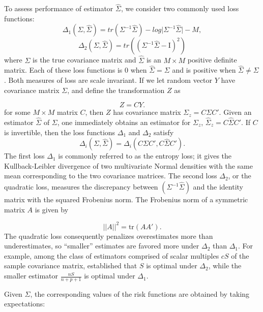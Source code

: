 \documentclass[12pt]{article}
\theoremstyle{definition}
\begin{document}
To assess performance of estimator $\hat{\Sigma}$, we consider two commonly used loss functions:
\begin{equation} \label{eq:quad-loss}
\Delta_1\left(\Sigma,\hat{\Sigma} \right) = tr\left( \Sigma^{-1} \hat{\Sigma} \right) - log \vert \Sigma^{-1} \hat{\Sigma} \vert - M,
\end{equation}
\noindent
\begin{equation} \label{eq:entropy-loss}
\Delta_2\left(\Sigma,\hat{\Sigma}\right) = tr\left(\left( \Sigma^{-1} \hat{\Sigma} - \mathrm{I}\right)^2 \right)
\end{equation}
\noindent
where $\Sigma$ is the true covariance matrix and $\hat{\Sigma}$ is an $M \times M$ positive definite matrix. Each of these loss functions is $0$ when $\hat{\Sigma} = \Sigma$ and is positive when $\hat{\Sigma} \ne \Sigma$. Both measures of loss are scale invariant. If we let random vector $Y$ have covariance matrix $\Sigma$, and define the transformation $Z$ as

\[
Z = CY. 
\]
\noindent
for some $M \times M$ matrix $C$,  then $Z$ has covariance matrix $\Sigma_z = C \Sigma C'$. Given an estimator $\hat{\Sigma}$ of $\Sigma$, one immediately obtains an estimator for $\Sigma_z$, $\hat{\Sigma}_z = C \hat{\Sigma} C'$. If $C$ is invertible, then the loss functions $\Delta_1$ and $\Delta_2$ satisfy
\[
\Delta_i\left(\Sigma,\hat{\Sigma}\right) = \Delta_i\left(C \Sigma C', C \hat{\Sigma}C' \right). 
\]
\noindent
The first loss $\Delta_1$ is commonly referred to as the entropy loss; it gives the Kullback-Leibler divergence of two multivariate Normal densities with the same mean corresponding to the two covariance matrices. The second loss $\Delta_2$, or the quadratic loss, measures the discrepancy between $\left(\Sigma^{-1} \hat{\Sigma}\right)$ and the identity matrix with the squared Frobenius norm. The Frobenius norm of a symmetric matrix $A$ is given by 

\[
\vert \vert A \vert \vert^2 = \mbox{tr}\left(A A'\right).
\]
\noindent
The quadratic loss consequently penalizes overestimates more than underestimates, so ``smaller'' estimates are favored more under $\Delta_2$ than $\Delta_1$. For example, among the class of estimators comprised of scalar multiples $cS$ of the sample covariance matrix, \citet{haff1980empirical} established that $S$ is optimal under $\Delta_2$, while the smaller estimator $\frac{nS}{n+p+1}$ is optimal under $\Delta_1$. 

\bigskip

Given $\Sigma$, the corresponding values of the risk functions are obtained by taking expectations:
\end{document}
